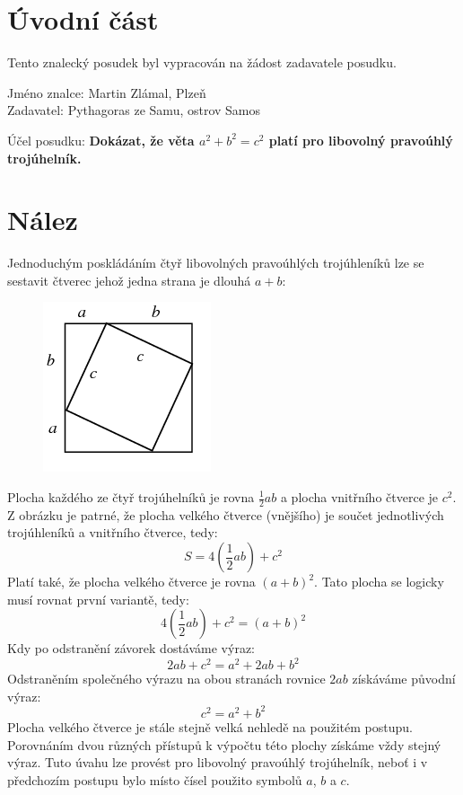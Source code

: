 \section*{Úvodní část}
Tento znalecký posudek byl vypracován na žádost zadavatele posudku.

\vspace{0.5cm}
\noindent
Jméno znalce: Martin Zlámal, Plzeň \\
Zadavatel: Pythagoras ze Samu, ostrov Samos

\vspace{0.5cm}
\noindent
Účel posudku: \textbf{Dokázat, že věta $a^2+b^2=c^2$ platí pro libovolný pravoúhlý trojúhelník.}

\section*{Nález}
Jednoduchým poskládáním čtyř libovolných pravoúhlých trojúhleníků lze se sestavit čtverec jehož jedna strana je dlouhá $a+b$:

\begin{figure}[h]
\includegraphics[scale=0.5]{prove.png}
\end{figure}

\noindent
Plocha každého ze čtyř trojúhelníků je rovna $\frac{1}{2}ab$ a plocha vnitřního čtverce je $c^2$. Z obrázku je patrné, že plocha velkého čtverce (vnějšího) je součet jednotlivých trojúhleníků a vnitřního čtverce, tedy:
\[S=4(\frac{1}{2}ab)+c^2\]
Platí také, že plocha velkého čtverce je rovna $(a+b)^2$. Tato plocha se logicky musí rovnat první variantě, tedy:
\[4(\frac{1}{2}ab)+c^2=(a+b)^2\]
Kdy po odstranění závorek dostáváme výraz:
\[2ab+c^2=a^2+2ab+b^2\]
Odstraněním společného výrazu na obou stranách rovnice $2ab$ získáváme původní výraz:
\[c^2=a^2+b^2\]
Plocha velkého čtverce je stále stejně velká nehledě na použitém postupu. Porovnáním dvou různých přístupů k výpočtu této plochy získáme vždy stejný výraz. Tuto úvahu lze provést pro libovolný pravoúhlý trojúhelník, neboť i v předchozím postupu bylo místo čísel použito symbolů $a$, $b$ a $c$.

